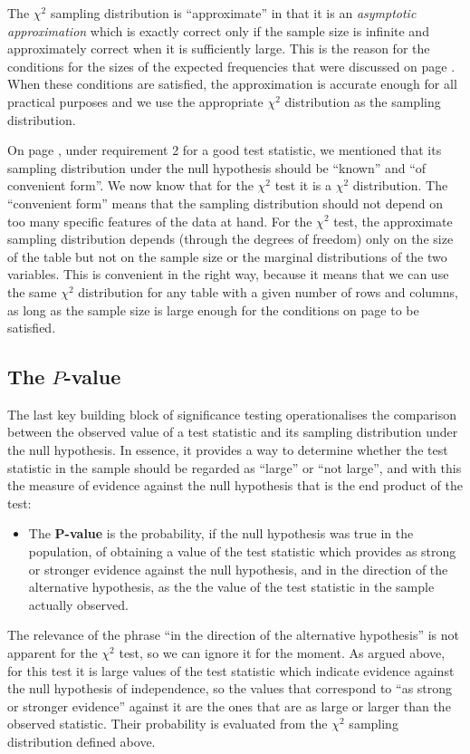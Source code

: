 The $\chi^{2}$ sampling distribution is ``approximate'' in that it is
an \emph{asymptotic approximation} which is exactly correct only if the
sample size is infinite and approximately correct when it is
sufficiently large. This is the reason for the conditions for the sizes
of the expected frequencies that were discussed on page
\pageref{p_chi2_fesize}. When these conditions are satisfied, the
approximation is accurate enough for all practical purposes and we use
the appropriate $\chi^{2}$ distribution as the sampling distribution.

On page \pageref{p_2reqs}, under requirement 2 for a good test
statistic, we mentioned that its sampling distribution under the null
hypothesis should be ``known'' and ``of convenient form''. We now know
that for the $\chi^{2}$ test it is a $\chi^{2}$ distribution.
The ``convenient form''  means that the sampling distribution
should not depend on too many specific features of the data at hand. For
the $\chi^{2}$ test, the approximate sampling distribution depends
(through the degrees of freedom) only on the size of the table but not
on the sample size or the marginal distributions of the two variables.
This is convenient in the right way, because it means that we can
use the same $\chi^{2}$ distribution for any table with a given number
of rows and columns, as long as the sample size is large enough for the
conditions on page \pageref{p_chi2_fesize} to be satisfied.

\subsection{The $P$-value}
\label{ss_tables_chi2test_Pval}

The last key building block of significance testing operationalises the
comparison between the observed value of a test statistic and its
sampling distribution under the null hypothesis. In essence, it provides
a way to determine whether the test statistic in the sample should be
regarded as ``large'' or ``not large'', and with this the measure of
evidence against the null hypothesis that is the end product of the
test:
\begin{itemize}
\item
\label{p_pval_ref}
The $\mathbf{P}$\textbf{-value} is the
probability, if the null hypothesis was true in the population, of
obtaining a value of the test statistic which provides as strong or
stronger evidence against the null hypothesis, and in the direction of
the alternative hypothesis, as the the value of the test statistic in
the sample actually observed.
\end{itemize}
The relevance of the phrase ``in the direction of the alternative
hypothesis'' is not apparent for the $\chi^{2}$ test, so we can ignore
it for the moment. As argued above, for this test it is large values of
the test statistic which indicate evidence against the null hypothesis
of independence, so the values that correspond to ``as strong or
stronger evidence'' against it are the ones that are as
large or larger than the observed statistic. Their probability is
evaluated from the $\chi^{2}$ sampling distribution defined above.

